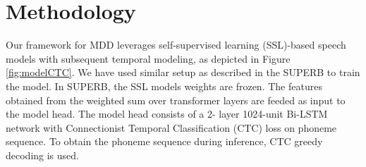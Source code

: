 \documentclass{Interspeech}
\begin{document}
\section{Methodology}
\label{sec:methodology}

\begin{table}[ht]
    \centering
    \caption{Data configurations for real, synthetic, and combined speech for model training and evaluation.}
    \label{tab:data_splits}

\end{table}


Our framework for MDD leverages self-supervised learning (SSL)-based speech models with subsequent temporal modeling, as depicted in Figure \ref{fig:modelCTC}. 
We have used similar setup as described in the SUPERB \cite{superb} to train the model. In SUPERB, the SSL models weights are frozen. The features obtained from the weighted sum over transformer layers are feeded as input to the model head. The model head consists of a 2-
layer 1024-unit Bi-LSTM network with Connectionist Temporal Classification (CTC) \cite{ctc} loss on phoneme sequence.
To obtain the phoneme sequence during inference, CTC greedy decoding is used. %
\end{document}
